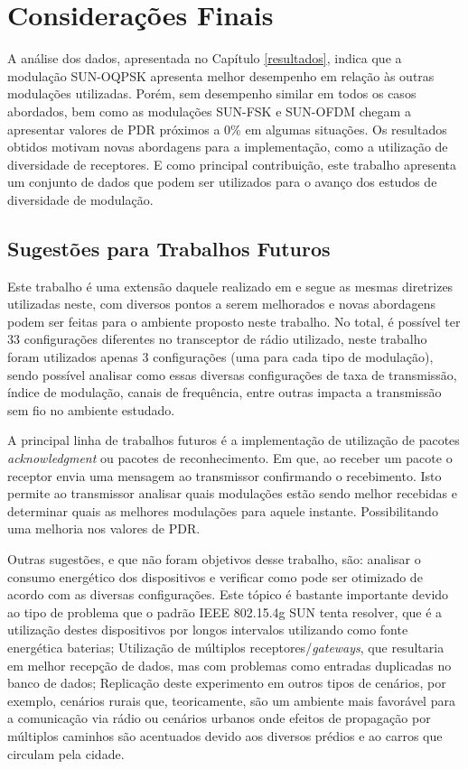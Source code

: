 \chapter{Considerações Finais}
\label{cap:conclusao}
A análise dos dados, apresentada no Capítulo \ref{resultados}, indica que a modulação SUN-OQPSK apresenta melhor desempenho em relação às outras modulações utilizadas. Porém, sem desempenho similar em todos os casos abordados, bem como as modulações SUN-FSK e SUN-OFDM chegam a apresentar valores de PDR próximos a 0\% em algumas situações. Os resultados obtidos motivam novas abordagens para a implementação, como a utilização de diversidade de receptores. E como principal contribuição, este trabalho apresenta um conjunto de dados que podem ser utilizados para o avanço dos estudos de diversidade de modulação.

\section{Sugestões para Trabalhos Futuros}
\label{sec:futuros}
Este trabalho é uma extensão daquele realizado em \cite{tuset2020dataset} e segue as mesmas diretrizes utilizadas neste, com diversos pontos a serem melhorados e novas abordagens podem ser feitas para o ambiente proposto neste trabalho. No total, é possível ter 33 configurações diferentes no transceptor de rádio utilizado, neste trabalho foram utilizados apenas 3 configurações (uma para cada tipo de modulação), sendo possível analisar como essas diversas configurações de taxa de transmissão, índice de modulação, canais de frequência, entre outras impacta a transmissão sem fio no ambiente estudado.

A principal linha de trabalhos futuros é a implementação de utilização de pacotes \emph{acknowledgment} ou pacotes de reconhecimento. Em que, ao receber um pacote o receptor envia uma mensagem ao transmissor confirmando o recebimento. Isto permite ao transmissor analisar quais modulações estão sendo melhor recebidas e determinar quais as melhores modulações para aquele instante. Possibilitando uma melhoria nos valores de PDR.

Outras sugestões, e que não foram objetivos desse trabalho, são: analisar o consumo energético dos dispositivos e verificar como pode ser otimizado de acordo com as diversas configurações. Este tópico é bastante importante devido ao tipo de problema que o padrão IEEE 802.15.4g SUN tenta resolver, que é a utilização destes dispositivos por longos intervalos utilizando como fonte energética baterias; Utilização de múltiplos receptores/\emph{gateways}, que resultaria em melhor recepção de dados, mas com problemas como entradas duplicadas no banco de dados; Replicação deste experimento em outros tipos de cenários, por exemplo, cenários rurais que, teoricamente, são um ambiente mais favorável para a comunicação via rádio ou cenários urbanos onde efeitos de propagação por múltiplos caminhos são acentuados devido aos diversos prédios e ao carros que circulam pela cidade.